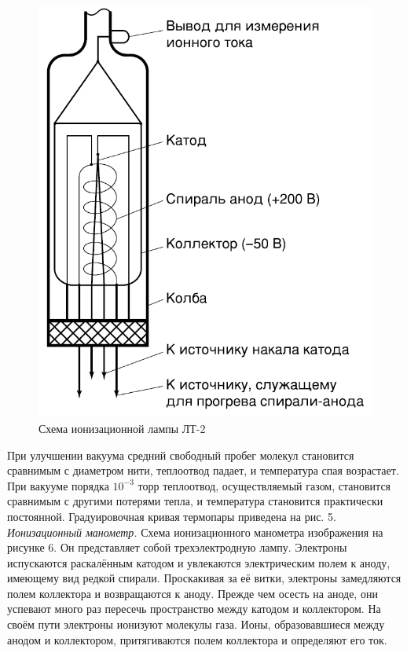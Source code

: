 \documentclass[a4paper, 12pt]{article}
\begin{document}
 \begin{figure} %
	\begin{center}
		\includegraphics[width=\linewidth]{8.png}
		\caption{Схема ионизационной лампы ЛТ-2}
		\label{fig:лампа}
	\end{center}
\end{figure}

 При улучшении вакуума средний свободный пробег молекул становится сравнимым с диаметром нити, теплоотвод падает, и температура спая возрастает. При вакууме порядка $10^{-3}$ торр теплоотвод, осуществляемый газом, становится сравнимым с другими потерями тепла, и температура становится практически постоянной. Градуировочная кривая термопары приведена на рис. 5. \\

\textit{Ионизационный манометр.} Схема ионизационного манометра изображения на рисунке 6. Он представляет собой трехэлектродную лампу. Электроны испускаются раскалённым катодом и увлекаются электрическим полем к аноду, имеющему вид редкой спирали. Проскакивая за её витки, электроны замедляются полем коллектора и возвращаются к аноду. Прежде чем осесть на аноде, они успевают много раз пересечь пространство между катодом и коллектором. На своём пути электроны ионизуют молекулы газа. Ионы, образовавшиеся между анодом и коллектором, притягиваются полем коллектора и определяют его ток. \\
\end{document}
